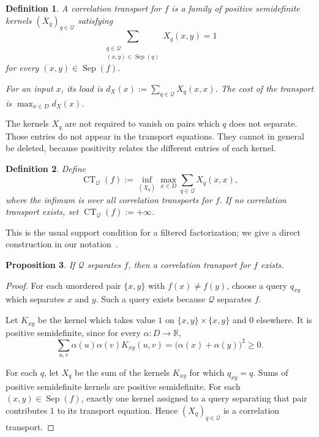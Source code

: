 \documentclass[11pt]{article}
\numberwithin{equation}{section}
\newtheorem{definition}{Definition}[section]
\newtheorem{proposition}[definition]{Proposition}
\theoremstyle{remark}
\begin{document}
\begin{definition}
\label{def:correlation-transport}
A \emph{correlation transport} for $f$ is a family of positive semidefinite kernels
$(X_q)_{q\in\mathcal Q}$ satisfying
\begin{equation}
    \sum_{\substack{q\in\mathcal Q\\
                    (x,y)\in\operatorname{Sep}(q)}}
        X_q(x,y)
    =
    1
\end{equation}
for every $(x,y)\in\operatorname{Sep}(f)$.

For an input $x$, its load is
$d_X(x):=\sum_{q\in\mathcal Q}X_q(x,x)$. The cost of the transport is
$\max_{x\in D}d_X(x)$.
\end{definition}

The kernels $X_q$ are not required to vanish on pairs which $q$ does not
separate. Those entries do not appear in the transport equations.
They cannot in general be deleted, because positivity relates the different
entries of each kernel.

\begin{definition}
\label{def:correlation-transport-value}
Define
\begin{equation}
    \operatorname{CT}_{\mathcal Q}(f)
    :=
    \inf_{(X_q)}
    \max_{x\in D}
    \sum_{q\in\mathcal Q}X_q(x,x),
\end{equation}
where the infimum is over all correlation transports for $f$. If no
correlation transport exists, set
$\operatorname{CT}_{\mathcal Q}(f):=+\infty$.
\end{definition}

This is the usual support condition for a filtered factorization; we give a direct construction in our notation~\cite{LeeMittalReichardtSpalekSzegedy2011}.

\begin{proposition}
\label{prop:correlation-transport-feasible}
If $\mathcal Q$ separates $f$, then a correlation transport for $f$ exists.
\end{proposition}

\begin{proof}
For each unordered pair $\{x,y\}$ with $f(x)\neq f(y)$, choose a query
$q_{xy}$ which separates $x$ and $y$. Such a query exists because
$\mathcal Q$ separates $f$.

Let $K_{xy}$ be the kernel which takes value $1$ on
$\{x,y\}\times\{x,y\}$ and $0$ elsewhere. It is positive semidefinite, since for every
$\alpha:D\to\mathbb R$,
\begin{equation}
    \sum_{u,v}\alpha(u)\alpha(v)K_{xy}(u,v)
    =
    \bigl(\alpha(x)+\alpha(y)\bigr)^2
    \geq0.
\end{equation}

For each $q$, let $X_q$ be the sum of the kernels $K_{xy}$ for which
$q_{xy}=q$. Sums of positive semidefinite kernels are positive semidefinite. For each
$(x,y)\in\operatorname{Sep}(f)$, exactly one kernel assigned to a query
separating that pair contributes $1$ to its transport equation. Hence
$(X_q)_{q\in\mathcal Q}$ is a correlation transport.
\end{proof}
\end{document}
